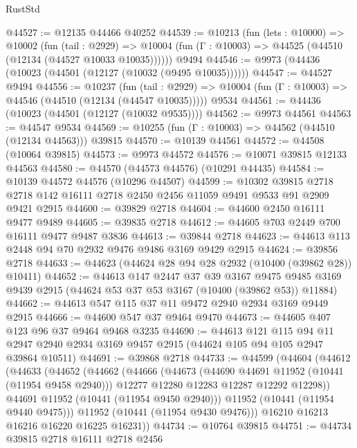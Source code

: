 \begin{lexlean}{RustStd}
\begin{coremodule}
@44527 := @12135 @44466 @40252
@44539 := @10213
    (fun (lets : @10000) =>
    @10002
      (fun (tail : @2929) =>
      @10004 (fun (Γ : @10003) => @44525 (@44510 (@12134 (@44527 @10033 @10035))))))
    @9494
@44546 := @9973 (@44436 (@10023 (@44501 (@12127 (@10032 (@9495 @10035))))))
@44547 := @44527 @9494
@44556 := @10237
    (fun (tail : @2929) => @10004 (fun (Γ : @10003) => @44546 (@44510 (@12134 (@44547 @10035)))))
    @9534
@44561 := @44436 (@10023 (@44501 (@12127 (@10032 @9535))))
@44562 := @9973 @44561
@44563 := @44547 @9534
@44569 := @10255 (fun (Γ : @10003) => @44562 (@44510 (@12134 @44563))) @39815
@44570 := @10139 @44561
@44572 := @44508 (@10064 @39815)
@44573 := @9973 @44572
@44576 := @10071 @39815 @12133 @44563
@44580 := @44570 (@44573 @44576) (@10291 @44435)
@44584 := @10139 @44572 @44576 (@10296 @44507)
@44599 := @10302
    @39815
    @2718
    @2718
    @142
    @16111
    @2718
    @2450
    @2456
    @11059
    @9491
    @9533
    @91
    @2909
    @9421
    @2915
@44600 := @39829 @2718
@44604 := @44600 @2450 @16111 @9477 @9489
@44605 := @39835 @2718
@44612 := @44605 @703 @2449 @700 @16111 @9477 @9487 @3836
@44613 := @39844 @2718
@44623 := @44613 @113 @2448 @94 @70 @2932 @9476 @9486 @3169 @9429 @2915
@44624 := @39856 @2718
@44633 := @44623 (@44624 @28 @94 @28 @2932 (@10400 (@39862 @28)) @10411)
@44652 := @44613
    @147
    @2447
    @37
    @39
    @3167
    @9475
    @9485
    @3169
    @9439
    @2915
    (@44624 @53 @37 @53 @3167 (@10400 (@39862 @53)) @11884)
@44662 := @44613 @547 @115 @37 @11 @9472 @2940 @2934 @3169 @9449 @2915
@44666 := @44600 @547 @37 @9464 @9470
@44673 := @44605 @407 @123 @96 @37 @9464 @9468 @3235
@44690 := @44613
    @121
    @115
    @94
    @11
    @2947
    @2940
    @2934
    @3169
    @9457
    @2915
    (@44624 @105 @94 @105 @2947 @39864 @10511)
@44691 := @39868 @2718
@44733 := @44599
    (@44604
      (@44612
        (@44633
          (@44652
            (@44662
              (@44666
                (@44673
                  (@44690 @44691 @11952 (@10441 (@11954 @9458 @2940)))
                  @12277
                  @12280
                  @12283
                  @12287
                  @12292
                  @12298))
              @44691
              @11952
              (@10441 (@11954 @9450 @2940)))
            @11952
            (@10441 (@11954 @9440 @9475)))
          @11952
          (@10441 (@11954 @9430 @9476)))
        @16210
        @16213
        @16216
        @16220
        @16225
        @16231))
@44734 := @10764 @39815
@44751 := @44734
    @39815
    @2718
    @16111
    @2718
    @2456

\end{coremodule}
\end{lexlean}
